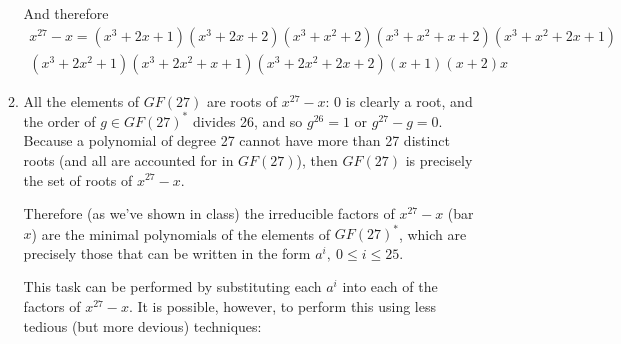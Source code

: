 \documentclass[11pt]{article} \usepackage{amssymb}
\begin{document}
\begin{enumerate}
\begin{enumerate}
    And therefore
    \begin{eqnarray*}
       x^{27} - x = (x^3 + 2x + 1)(x^3 + 2x + 2)(x^3 + x^2 + 2)(x^3 + x^2 + x + 2)(x^3 + x^2 + 2x + 1)&\\
    (x^3 + 2x^2 + 1)(x^3 + 2x^2 + x + 1)(x^3 + 2x^2 + 2x + 2)(x + 1)(x + 2)x&
    \end{eqnarray*}


  \item
    All the elements of $GF(27)$ are roots of $x^{27}-x$: 0 is clearly a root,
    and the order of $g \in GF(27)^*$ divides 26, and so $g^{26}=1$ or
    $g^{27}-g=0$. 
    Because a polynomial of degree 27 cannot have more than 27 distinct
    roots (and all are accounted for in $GF(27)$), then $GF(27)$ is precisely
    the set of roots of $x^{27}-x$.

    Therefore (as we've shown in class) the irreducible factors of $x^{27}-x$
    (bar $x$) are the minimal polynomials of the elements of $GF(27)^*$, which are 
    precisely those that can be written in the form $a^i,\:0 \leq i \leq 25$.

    This task can be performed by substituting each $a^i$ into each of the 
    factors of $x^{27}-x$. It is possible, however, to perform this using
    less tedious (but more devious) techniques:


\end{enumerate}
\end{enumerate}
\end{document}
